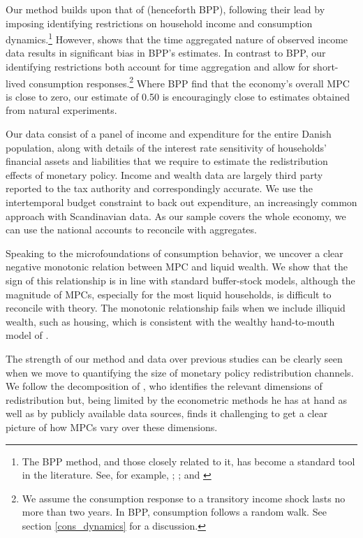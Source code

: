 \documentclass[titlepage]{\econtex}\newcommand{\texname}{ConsumptionHeterogeneity}
\begin{document}
Our method builds upon that of \cite{blundell_consumption_2008} (henceforth BPP), following their lead by imposing identifying restrictions on household income and consumption dynamics.\footnote{The BPP method, and those closely related to it, has become a standard tool in the literature. See, for example, \cite{violante_wealthy_2014}; \cite{auclert_monetary_2017}; and \cite{manovskii_how_2017}} However, \cite{crawley_time_2018} shows that the time aggregated nature of observed income data results in significant bias in BPP's estimates. In contrast to BPP, our identifying restrictions both account for time aggregation and allow for short-lived consumption responses.\footnote{We assume the consumption response to a transitory income shock lasts no more than two years. In BPP, consumption follows a random walk. See section \ref{cons_dynamics} for a discussion.} Where BPP find that the economy's overall MPC is close to zero, our estimate of 0.50 is encouragingly close to estimates obtained from natural experiments.

Our data consist of a panel of income and expenditure for the entire Danish population, along with details of the interest rate sensitivity of households' financial assets and liabilities that we require to estimate the redistribution effects of monetary policy. Income and wealth data are largely third party reported to the tax authority and correspondingly accurate. We use the intertemporal budget constraint to back out expenditure, an increasingly common approach with Scandinavian data. As our sample covers the whole economy, we can use the national accounts to reconcile with aggregates.

Speaking to the microfoundations of consumption behavior, we uncover a clear negative monotonic relation between MPC and liquid wealth. We show that the sign of this relationship is in line with standard buffer-stock models, although the magnitude of MPCs, especially for the most liquid households, is difficult to reconcile with theory. The monotonic relationship fails when we include illiquid wealth, such as housing, which is consistent with the wealthy hand-to-mouth model of \cite{violante_wealthy_2014}.

The strength of our method and data over previous studies can be clearly seen when we move to quantifying the size of monetary policy redistribution channels. We follow the decomposition of \cite{auclert_monetary_2017}, who identifies the relevant dimensions of redistribution but, being limited by the econometric methods he has at hand as well as by publicly available data sources, finds it challenging to get a clear picture of how MPCs vary over these dimensions.
\end{document}
